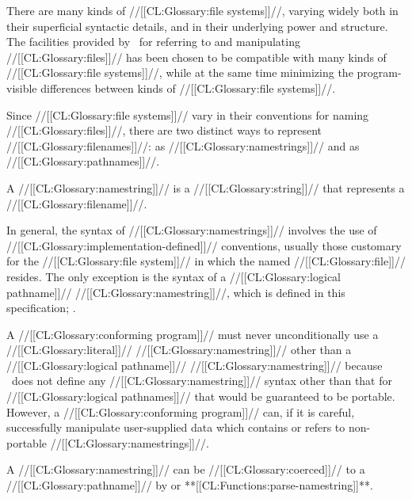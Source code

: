 

There are many kinds of //[[CL:Glossary:file systems]]//,
varying widely both in their superficial syntactic details,
		and in their underlying power and structure.
The facilities provided by \clisp\ for referring to and manipulating //[[CL:Glossary:files]]//
has been chosen to be compatible with many kinds of //[[CL:Glossary:file systems]]//,
while at the same time minimizing the program-visible differences 
between kinds of //[[CL:Glossary:file systems]]//.


Since //[[CL:Glossary:file systems]]// vary in their conventions for naming //[[CL:Glossary:files]]//,
there are two distinct ways to represent //[[CL:Glossary:filenames]]//:
as //[[CL:Glossary:namestrings]]// and as //[[CL:Glossary:pathnames]]//.


A //[[CL:Glossary:namestring]]// is a //[[CL:Glossary:string]]// that represents a //[[CL:Glossary:filename]]//.

In general, the syntax of //[[CL:Glossary:namestrings]]// involves the use of 
//[[CL:Glossary:implementation-defined]]// conventions, 
usually those customary for the //[[CL:Glossary:file system]]// in which the named //[[CL:Glossary:file]]// resides.
The only exception is the syntax of a //[[CL:Glossary:logical pathname]]// //[[CL:Glossary:namestring]]//,
which is defined in this specification; \seesection\LogPathNamestrings.


A //[[CL:Glossary:conforming program]]// must never unconditionally use a
//[[CL:Glossary:literal]]// //[[CL:Glossary:namestring]]// other than a //[[CL:Glossary:logical pathname]]// //[[CL:Glossary:namestring]]//
because \clisp\ does not define any //[[CL:Glossary:namestring]]// syntax 
other than that for //[[CL:Glossary:logical pathnames]]//
that would be guaranteed to be portable.
However, a //[[CL:Glossary:conforming program]]// can, if it is careful, 
successfully manipulate user-supplied data 
which contains or refers to non-portable //[[CL:Glossary:namestrings]]//.


A //[[CL:Glossary:namestring]]// can be //[[CL:Glossary:coerced]]// to a //[[CL:Glossary:pathname]]// by 
or **[[CL:Functions:parse-namestring]]**.





\endSubsection%

